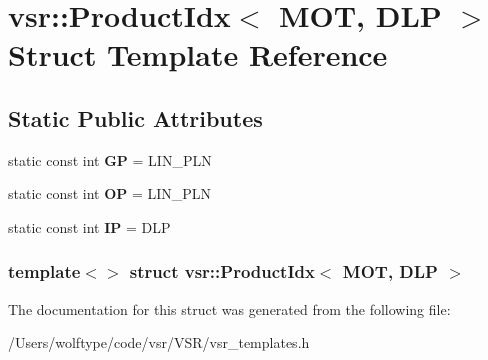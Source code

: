 \hypertarget{structvsr_1_1_product_idx_3_01_m_o_t_00_01_d_l_p_01_4}{\section{vsr\-:\-:Product\-Idx$<$ M\-O\-T, D\-L\-P $>$ Struct Template Reference}
\label{structvsr_1_1_product_idx_3_01_m_o_t_00_01_d_l_p_01_4}
}
\subsection*{Static Public Attributes}
\begin{DoxyCompactItemize}
\item 
\hypertarget{structvsr_1_1_product_idx_3_01_m_o_t_00_01_d_l_p_01_4_a6b647a50f0be631b0ea7e949c19fdd10}{static const int {\bfseries G\-P} = L\-I\-N\-\_\-\-P\-L\-N}\label{structvsr_1_1_product_idx_3_01_m_o_t_00_01_d_l_p_01_4_a6b647a50f0be631b0ea7e949c19fdd10}

\item 
\hypertarget{structvsr_1_1_product_idx_3_01_m_o_t_00_01_d_l_p_01_4_a0faa4e3de8c4d46a77ea13c4f76bc119}{static const int {\bfseries O\-P} = L\-I\-N\-\_\-\-P\-L\-N}\label{structvsr_1_1_product_idx_3_01_m_o_t_00_01_d_l_p_01_4_a0faa4e3de8c4d46a77ea13c4f76bc119}

\item 
\hypertarget{structvsr_1_1_product_idx_3_01_m_o_t_00_01_d_l_p_01_4_a28dae094b8ecf022de6b979f0173fe54}{static const int {\bfseries I\-P} = D\-L\-P}\label{structvsr_1_1_product_idx_3_01_m_o_t_00_01_d_l_p_01_4_a28dae094b8ecf022de6b979f0173fe54}

\end{DoxyCompactItemize}
\subsubsection*{template$<$$>$ struct vsr\-::\-Product\-Idx$<$ M\-O\-T, D\-L\-P $>$}



The documentation for this struct was generated from the following file\-:\begin{DoxyCompactItemize}
\item 
/\-Users/wolftype/code/vsr/\-V\-S\-R/vsr\-\_\-templates.\-h\end{DoxyCompactItemize}
